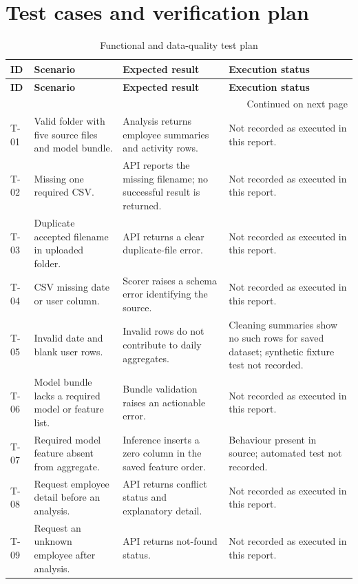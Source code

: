\section{Test cases and verification plan}
\label{app:test-plan}
\begin{longtable}{|p{}|p{}|p{}|p{}|}
\caption{Functional and data-quality test plan}\label{tab:test-cases}\\
\hline
\textbf{ID} & \textbf{Scenario} & \textbf{Expected result} & \textbf{Execution status}\\\hline
\endfirsthead
\hline
\textbf{ID} & \textbf{Scenario} & \textbf{Expected result} & \textbf{Execution status}\\\hline
\endhead
\hline
\multicolumn{4}{r}{Continued on next page}\\
\endfoot
\hline
\endlastfoot
T-01 & Valid folder with five source files and model bundle. & Analysis returns employee summaries and activity rows. & Not recorded as executed in this report.\\\hline
T-02 & Missing one required CSV. & API reports the missing filename; no successful result is returned. & Not recorded as executed in this report.\\\hline
T-03 & Duplicate accepted filename in uploaded folder. & API returns a clear duplicate-file error. & Not recorded as executed in this report.\\\hline
T-04 & CSV missing date or user column. & Scorer raises a schema error identifying the source. & Not recorded as executed in this report.\\\hline
T-05 & Invalid date and blank user rows. & Invalid rows do not contribute to daily aggregates. & Cleaning summaries show no such rows for saved dataset; synthetic fixture test not recorded.\\\hline
T-06 & Model bundle lacks a required model or feature list. & Bundle validation raises an actionable error. & Not recorded as executed in this report.\\\hline
T-07 & Required model feature absent from aggregate. & Inference inserts a zero column in the saved feature order. & Behaviour present in source; automated test not recorded.\\\hline
T-08 & Request employee detail before an analysis. & API returns conflict status and explanatory detail. & Not recorded as executed in this report.\\\hline
T-09 & Request an unknown employee after analysis. & API returns not-found status. & Not recorded as executed in this report.\\\hline

\end{longtable}
